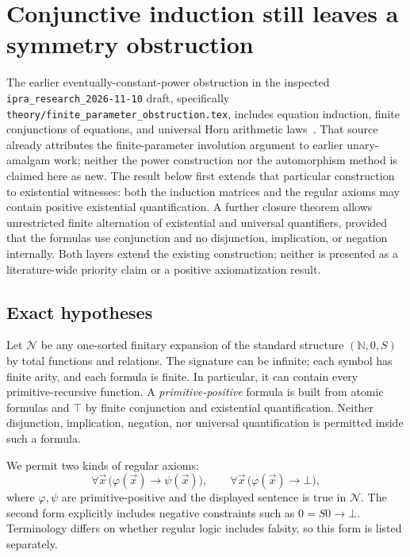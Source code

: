 \section{Conjunctive induction still leaves a symmetry obstruction}
\label{sec:pp-obstruction}

The earlier eventually-constant-power obstruction in the inspected
\texttt{ipra\_research\_2026-11-10} draft, specifically
\texttt{theory/finite\_parameter\_obstruction.tex}, includes equation
induction, finite conjunctions of equations, and universal Horn
arithmetic laws~\cite{research}.  That source already attributes the finite-parameter
involution argument to earlier unary-amalgam work; neither the power
construction nor the automorphism method is claimed here as new.
The result below first extends that particular construction to existential
witnesses: both the induction matrices and the regular axioms may contain
positive existential quantification.  A further closure theorem allows
unrestricted finite alternation of existential and universal quantifiers,
provided that the formulas use conjunction and no disjunction,
implication, or negation internally.  Both layers extend the existing
construction; neither is presented as a literature-wide priority claim
or a positive axiomatization result.

\subsection{Exact hypotheses}

Let $\mathcal N$ be any one-sorted finitary expansion of the standard
structure $(\mathbb N,0,S)$ by total functions and relations.  The
signature can be infinite; each symbol has finite arity, and each formula
is finite.  In particular, it can contain every primitive-recursive
function.  A \emph{primitive-positive} formula is built from atomic
formulas and $\top$ by finite conjunction and existential quantification.
Neither disjunction, implication, negation, nor universal quantification
is permitted inside such a formula.

We permit two kinds of regular axioms:
\[
 \forall\vec x\,\bigl(\varphi(\vec x)\to\psi(\vec x)\bigr),
 \qquad
 \forall\vec x\,\bigl(\varphi(\vec x)\to\bot\bigr),
 \tag{Reg}\label{eq:pp-regular}
\]
where $\varphi,\psi$ are primitive-positive and the displayed sentence
is true in $\mathcal N$.  The second form explicitly includes negative
constraints such as $0=S0\to\bot$.  Terminology differs on whether
regular logic includes falsity, so this form is listed separately.

